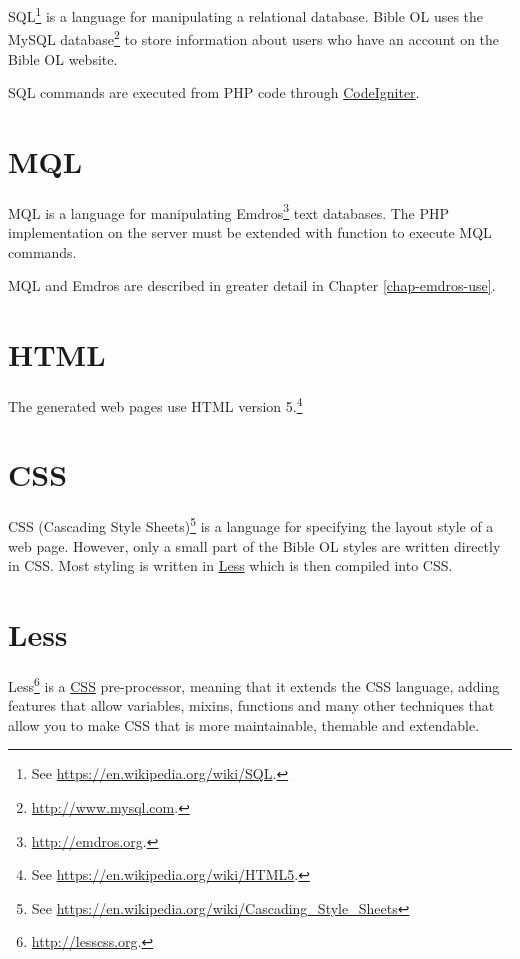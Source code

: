 \documentclass[11pt,oneside,a4paper]{memoir}
\begin{document}
SQL\footnote{See \url{https://en.wikipedia.org/wiki/SQL}.} is a language for manipulating a
relational database. Bible OL uses the MySQL database\footnote{\url{http://www.mysql.com}.} to store
information about users who have an account on the Bible OL website.

SQL commands are executed from PHP code through \hyperref[sec-codeigniter]{CodeIgniter}.


\section{MQL}\label{sec-mql}

MQL is a language for manipulating Emdros\footnote{\url{http://emdros.org}.} text databases. The PHP
implementation on the server must be extended with function to execute MQL commands.

MQL and Emdros are described in greater detail in Chapter \ref{chap-emdros-use}.



\section{HTML}

The generated web pages use HTML version 5.\footnote{See \url{https://en.wikipedia.org/wiki/HTML5}.}


\section{CSS}\label{sec-css}

CSS (Cascading Style Sheets)\footnote{See
  \url{https://en.wikipedia.org/wiki/Cascading_Style_Sheets}} is a language for specifying the
layout style of a web page. However, only a small part of the Bible OL styles are written directly
in CSS. Most styling is written in \hyperref[sec-less]{Less} which is then compiled into CSS.


\section{Less}\label{sec-less}

Less\footnote{\url{http://lesscss.org}.} is a \hyperref[sec-css]{CSS} pre-processor, meaning that it
extends the CSS language, adding features that allow variables, mixins, functions and many other
techniques that allow you to make CSS that is more maintainable, themable and extendable.
\end{document}
